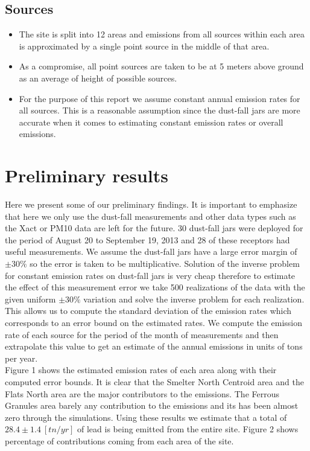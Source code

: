 \documentclass[11pt]{article}
\begin{document}
\subsection{Sources}
\begin{itemize}
\item The site is split into 12 areas and emissions from all sources 
within each area is approximated by a single point source in the 
middle of that area.
\item As a compromise, all point sources are taken to be at 5 meters 
above ground as an average of height of possible sources.
\item For the purpose of this report we assume constant annual emission 
rates for all sources. This is a reasonable assumption since the 
dust-fall jars are more accurate when it comes to estimating constant emission 
rates or overall emissions.
\end{itemize}
\section{Preliminary results}
Here we present some of our preliminary findings. It is important to 
emphasize that here we only use the dust-fall measurements and 
other data types such as the Xact or PM10 data are left for the 
future. 30 dust-fall jars were deployed for the period of August 20 to 
September 19, 2013 and 28 of these receptors had useful measurements. 
We assume the dust-fall jars have a large error margin of $\pm 30 \% $
so the error is taken to be multiplicative. Solution of the inverse problem
for constant emission rates on dust-fall jars is very cheap therefore 
to estimate the effect of this measurement error we take 500 realizations 
of the data with the given uniform  $\pm 30 \%$ variation and solve the 
inverse problem for each realization. This allows us to compute the 
standard deviation of the emission rates which corresponds to an error bound 
on the estimated rates. We compute the emission rate of each source 
for the period of the month of measurements and then extrapolate this value 
to get an estimate of the annual emissions in units of tons per year. 
\\

Figure 1 shows the estimated emission rates of each area along with 
their computed error bounds. It is clear that the Smelter North 
Centroid area and the Flats North area are the major contributors to 
the emissions. The Ferrous Granules area barely any contribution to 
the emissions and its has been almost zero through the simulations. 
Using these results we estimate that a total of $28.4 \pm 1.4 \: [tn/yr]$
of lead is being emitted from the entire site. Figure 2 shows percentage of 
contributions coming from each area of the site.
\end{document}
